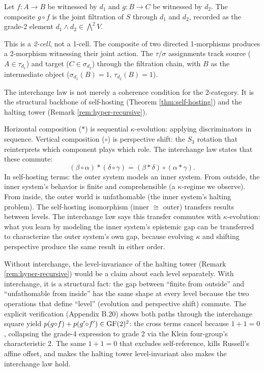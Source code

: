 \begin{definition}\label{def:composition}
Let $f: A \to B$ be witnessed by $d_1$ and $g: B \to C$ be
witnessed by $d_2$. The composite $g \circ f$ is
the joint filtration of $S$ through $d_1$ and $d_2$,
recorded as the grade-2 element
$d_1 \wedge d_2 \in \bigwedge^2 V$.

This is a \emph{2-cell}, not a 1-cell. The composite of
two directed 1-morphisms produces a 2-morphism witnessing
their joint action. The $\tau/\sigma$ assignments track
source ($A \in \tau_{d_1}$) and target
($C \in \sigma_{d_2}$) through the filtration chain, with
$B$ as the intermediate object ($\sigma_{d_1}(B) = 1$,
$\tau_{d_2}(B) = 1$).
\end{definition}

\begin{remark}
\label{rem:interchange-selfhosting}
The interchange law is not merely a coherence condition
for the 2-category. It is the structural backbone of
self-hosting (Theorem \ref{thm:self-hosting}) and the
halting tower (Remark \ref{rem:hyper-recursive}).

Horizontal composition ($*$) is sequential
$\kappa$-evolution: applying discriminators in sequence.
Vertical composition ($\circ$) is perspective shift:
the $S_3$ rotation that reinterprets which component
plays which role. The interchange law states that
these commute:
\[
  (\beta \circ \alpha) * (\delta \circ \gamma)
  = (\beta * \delta) \circ (\alpha * \gamma).
\]
In self-hosting terms: the outer system models an inner
system. From outside, the inner system's behavior is
finite and comprehensible (a $\kappa$-regime we
observe). From inside, the outer world is unfathomable
(the inner system's halting problem). The self-hosting
isomorphism (inner $\cong$ outer) transfers results
between levels. The interchange law says this transfer
commutes with $\kappa$-evolution: what you learn by
modeling the inner system's epistemic gap can be
transferred to characterize the outer system's own gap,
because evolving $\kappa$ and shifting perspective
produce the same result in either order.

Without interchange, the level-invariance of the halting
tower (Remark \ref{rem:hyper-recursive}) would be a
claim about each level separately. With interchange, it
is a structural fact: the gap between ``finite from
outside'' and ``unfathomable from inside'' has the
same shape at every level because the two operations
that define ``level'' (evolution and perspective shift)
commute. The explicit verification (Appendix B.20)
shows both paths through the interchange square yield
$p(g{\circ}f) + p(g'{\circ}f') \in \operatorname{GF}(2)^2$: the
cross terms cancel because $1+1=0$, collapsing the
grade-4 expression to grade 2 via the Klein
four-group's characteristic 2. The same $1+1=0$ that
excludes self-reference, kills Russell's affine
offset, and makes the halting tower level-invariant
also makes the interchange law hold.
\end{remark}

